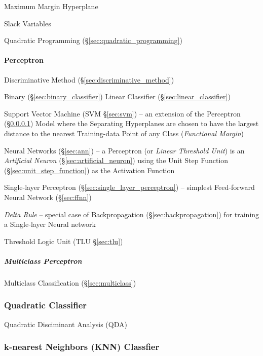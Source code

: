 Maximum Margin Hyperplane

Slack Variables

Quadratic Programming (\S\ref{sec:quadratic_programming})



\paragraph{Perceptron}\label{sec:perceptron}\hfill

Discriminative Method (\S\ref{sec:discriminative_method})

Binary (\S\ref{sec:binary_classifier}) Linear Classifier
(\S\ref{sec:linear_classifier})

\fist Support Vector Machine (SVM \S\ref{sec:svm}) -- an extension of the
Perceptron (\S\ref{sec:perceptron}) Model where the Separating Hyperplanes are
chosen to have the largest distance to the nearest Training-data Point of any
Class (\emph{Functional Margin})

\fist Neural Networks (\S\ref{sec:ann}) -- a Perceptron (or \emph{Linear
  Threshold Unit}) is an \emph{Artificial Neuron}
(\S\ref{sec:artificial_neuron}) using the Unit Step Function
(\S\ref{sec:unit_step_function}) as the Activation Function

\fist Single-layer Perceptron (\S\ref{sec:single_layer_perceptron})
-- simplest Feed-forward Neural Network (\S\ref{sec:ffnn})

\emph{Delta Rule} -- special case of Backpropagation
(\S\ref{sec:backpropagation}) for training a Single-layer Neural network

\fist Threshold Logic Unit (TLU \S\ref{sec:tlu})



\subparagraph{Multiclass Perceptron}\label{sec:multiclass_perceptron}\hfill

\fist Multiclass Classification (\S\ref{sec:multiclass})



\subsubsection{Quadratic Classifier}\label{sec:quadratic_classifier}

Quadratic Disciminant Analysis (QDA)



\subsubsection{k-nearest Neighbors (KNN) Classfier}\label{sec:knn_classifier}

